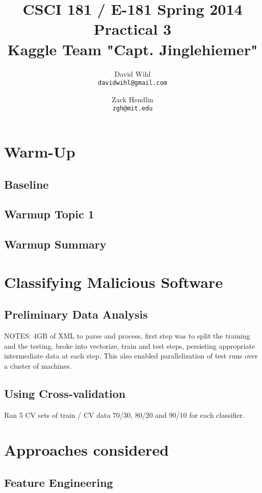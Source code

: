 \documentclass[11pt, oneside]{article}   	%
\title{CSCI 181 / E-181 Spring 2014 Practical 3 \\ 
{\large Kaggle Team "Capt. Jinglehiemer"}
}
\author{
  David Wihl\\
  \texttt{davidwihl@gmail.com}
  \and
  Zack Hendlin\\
  \texttt{zgh@mit.edu} 
}
\begin{document}
\maketitle
\section*{Warm-Up}

\subsection*{Baseline}

\subsection*{Warmup Topic 1}

\subsection*{Warmup Summary}

\section*{Classifying Malicious Software}

\subsection*{Preliminary Data Analysis}

NOTES:
4GB of XML to parse and process, first step was to split the training and the testing. broke into vectorize, train and test steps, persisting appropriate intermediate data at each step. This also enabled parallelization of test runs over a cluster of machines.

\subsection*{Using Cross-validation}

Ran 5 CV sets of train / CV data 70/30, 80/20 and 90/10 for each classifier.

\section*{Approaches considered}

\subsection*{Feature Engineering}
\end{document}
